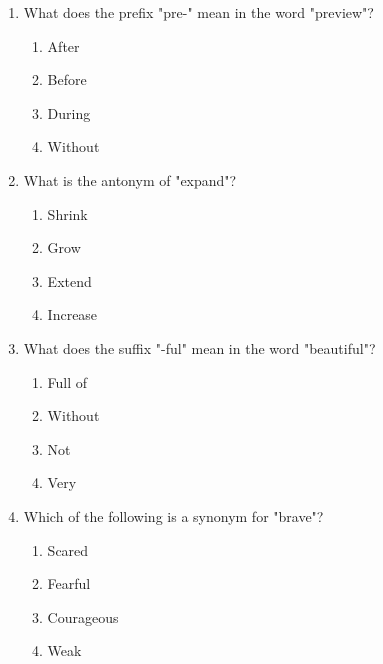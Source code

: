 \documentclass[12pt]{article}
\begin{document}
\begin{enumerate}
    \vspace{0.5cm}

    \item What does the prefix "pre-" mean in the word "preview"?

    \begin{enumerate}[label=\Alph*.]
        \item After
        \item Before
        \item During
        \item Without
    \end{enumerate}
    
    \vspace{0.5cm}

    \item What is the antonym of "expand"?

    \begin{enumerate}[label=\Alph*.]
        \item Shrink
        \item Grow
        \item Extend
        \item Increase
    \end{enumerate}
    
    \vspace{0.5cm}

    \item What does the suffix "-ful" mean in the word "beautiful"?

    \begin{enumerate}[label=\Alph*.]
        \item Full of
        \item Without
        \item Not
        \item Very
    \end{enumerate}
    
    \vspace{0.5cm}

    \item Which of the following is a synonym for "brave"?

    \begin{enumerate}[label=\Alph*.]
        \item Scared
        \item Fearful
        \item Courageous
        \item Weak
    \end{enumerate}
    

\end{enumerate}
\end{document}
